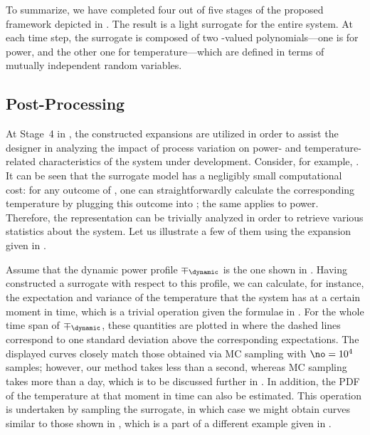 To summarize, we have completed four out of five stages of the proposed
framework depicted in . The result is a light surrogate for
the entire system. At each time step, the surrogate is composed of two
\np-valued polynomials---one is for power, and the other one for
temperature---which are defined in terms of \nz mutually independent random
variables.

\subsection{Post-Processing}

At Stage~4 in , the constructed expansions are utilized in
order to assist the designer in analyzing the impact of process variation on
power- and temperature-related characteristics of the system under development.
Consider, for example, . It can be seen that the
surrogate model has a negligibly small computational cost: for any outcome of
\vz, one can straightforwardly calculate the corresponding temperature by
plugging this outcome into ; the same applies to
power. Therefore, the representation can be trivially analyzed in order to
retrieve various statistics about the system. Let us illustrate a few of them
using the expansion given in .

Assume that the dynamic power profile $\mp_\dynamic$ is the one shown in
. Having constructed a surrogate with respect to
this profile, we can calculate, for instance, the expectation and variance of
the temperature that the system has at a certain moment in time, which is a
trivial operation given the formulae in . For the whole time
span of $\mp_\dynamic$, these quantities are plotted in
 where the dashed lines correspond to one
standard deviation above the corresponding expectations. The displayed curves
closely match those obtained via \ac{MC} sampling with $\no = 10^4$ samples;
however, our method takes less than a second, whereas \ac{MC} sampling takes
more than a day, which is to be discussed further in
. In addition, the \ac{PDF} of the temperature at
that moment in time can also be estimated. This operation is undertaken by
sampling the surrogate, in which case we might obtain curves similar to those
shown in , which is a part of a different
example given in .

